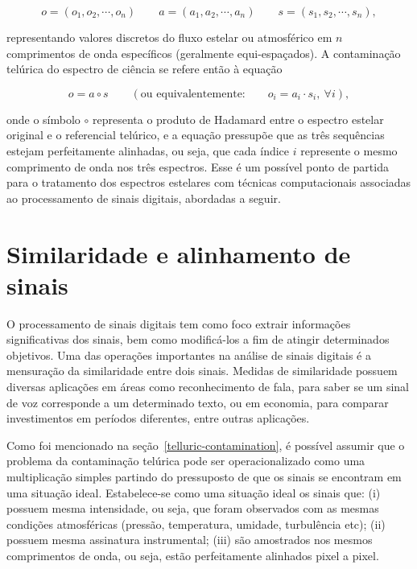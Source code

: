 \begin{equation*}
    o = (o_1, o_2, \cdots, o_{n}) \qquad a = (a_1, a_2, \cdots, a_{n}) \qquad s = (s_1, s_2, \cdots, s_{n}), 
\end{equation*}

\noindent representando valores discretos do fluxo estelar ou atmosférico em $n$ comprimentos de onda específicos (geralmente equi-espaçados). A contaminação telúrica do espectro de ciência se refere então à equação

\begin{equation*}
    o = a \circ s \qquad \left(\mbox{ou equivalentemente:} \qquad o_i = a_i\cdot s_i,\ \forall i\right),
\end{equation*}

\noindent onde o símbolo $\circ$ representa o produto de Hadamard entre o espectro estelar original e o referencial telúrico, e a equação pressupõe que as três sequências estejam perfeitamente alinhadas, ou seja, que cada índice $i$ represente o mesmo comprimento de onda nos três espectros. Esse é um possível ponto de partida para o tratamento dos espectros estelares com técnicas computacionais associadas ao processamento de sinais digitais, abordadas a seguir.


\section{Similaridade e alinhamento de sinais}\label{similarity-and-signal-alignment}

O processamento de sinais digitais tem como foco extrair informações significativas dos sinais, bem como modificá-los a fim de atingir determinados objetivos. Uma das operações importantes na análise de sinais digitais é a mensuração da similaridade entre dois sinais. Medidas de similaridade possuem diversas aplicações em áreas como reconhecimento de fala, para saber se um sinal de voz corresponde a um determinado texto, ou em economia, para comparar investimentos em períodos diferentes, entre outras aplicações.

Como foi mencionado na seção~\ref{telluric-contamination}, é possível assumir que o problema da contaminação telúrica pode ser operacionalizado como uma multiplicação simples partindo do pressuposto de que os sinais se encontram em uma situação ideal. Estabelece-se como uma situação ideal os sinais que: (i) possuem mesma intensidade, ou seja, que foram observados com as mesmas condições atmosféricas (pressão, temperatura, umidade, turbulência etc); (ii) possuem mesma assinatura instrumental; (iii) são amostrados nos mesmos comprimentos de onda, ou seja, estão perfeitamente alinhados pixel a pixel. 

